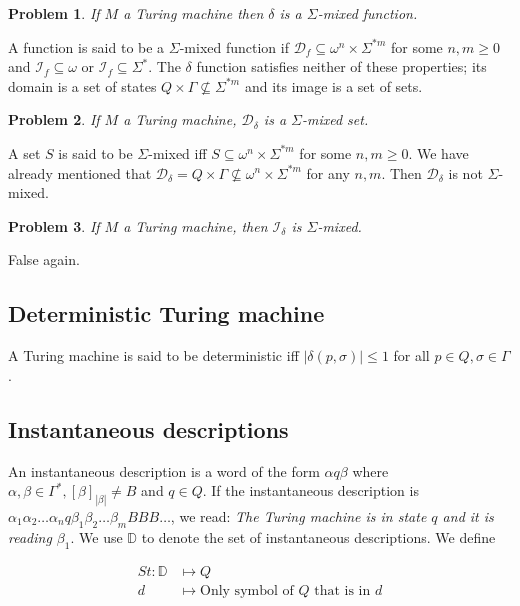 \documentclass[a4paper, 12pt]{article}
\newtheorem{problem}{Problem}
\newtheorem{problem}{Problem}
\begin{document}
\begin{problem}
    If $M$ a Turing machine then $\delta$ is a $\Sigma$-mixed function.
\end{problem}

A function is said to be a $\Sigma$-mixed function if $\mathcal{D}_f \subseteq
\omega^n \times \Sigma^{*m}$ for some $n, m \geq 0$ and $\mathcal{I}_f \subseteq
\omega$ or $\mathcal{I}_f \subseteq \Sigma^{*}$. The $\delta$ function satisfies
neither of these properties; its domain is a set of states $Q \times \Gamma \not\subseteq
\Sigma^{*m}$ and its image is a set of sets.

\begin{problem}
    If $M$ a Turing machine, $\mathcal{D}_{\delta}$ is a $\Sigma$-mixed set.
\end{problem}

A set $S$ is said to be $\Sigma$-mixed iff $S \subseteq \omega^n \times
\Sigma^{*m}$ for some $n, m \geq 0$. We have already mentioned that
$\mathcal{D}_\delta = Q \times \Gamma \not\subseteq \omega^n \times \Sigma^{*m}$ for any $n,
m$. Then $\mathcal{D}_\delta$ is not $\Sigma$-mixed.

\begin{problem}
    If $M$ a Turing machine, then $\mathcal{I}_{\delta}$ is $\Sigma$-mixed.
\end{problem}

False again.

\subsection{Deterministic Turing machine}

A Turing machine is said to be deterministic iff $|\delta(p, \sigma)| \leq 1$
for all $p \in Q, \sigma \in \Gamma$. 

\subsection{Instantaneous descriptions}

An instantaneous description is a word of the form $\alpha q \beta $ where
$\alpha, \beta \in \Gamma^{*}, [\beta]_{|\beta |} \neq B$ and $q \in Q$. If the
instantaneous description is $\alpha_1 \alpha_2 \ldots \alpha_n q \beta_1
\beta_2 \ldots \beta_m B B B \ldots$, we read: \textit{The Turing
machine is in state $q$ and it is reading $\beta_1$}. We use $\mathbb{D}$ to
denote the set of instantaneous descriptions. We define 

\begin{align*}
    St : \mathbb{D} &\mapsto  Q \\ 
    d &\mapsto \text{Only symbol of $Q$ that is in $d$}
\end{align*}
\end{document}
